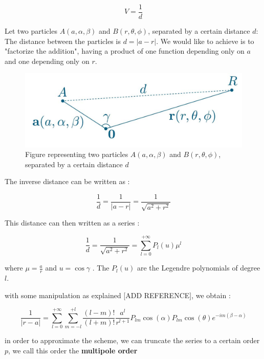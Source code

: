 \documentclass[12pt,twoside,a4paper]{report}
\begin{document}
	\begin{equation*}
	V = \frac{1}{d}
	\end{equation*}
	
	Let two particles $A(a,\alpha,\beta)$ and $B(r,\theta,\phi)$, separated by a certain distance $d$: The distance between the particles is $d = |a - r|$.
	We would like to achieve is to "factorize the addition", having a product of one function depending only on $a$ and one depending only on $r$.
	
	
\begin{figure}[H]
\includegraphics[scale=0.4]{distance}
 \centering 
\caption{Figure representing two particles $A(a,\alpha,\beta)$ and $B(r,\theta,\phi)$, separated by a certain distance $d$}
\label{fig:poster}
\end{figure}	
	
	
	The inverse distance can be written as :
	
	\begin{equation*}
		\frac{1}{d} = \frac{1}{|a-r|} = \frac{1}{\sqrt{a^2 + r^2}}
	\end{equation*}

	This distance can then written as a series :
	
	\begin{equation}
		\frac{1}{d} = \frac{1}{\sqrt{a^2 + r^2}} = \sum\limits_{l=0}^{+\infty} P_l(u)\mu^l
	\end{equation}
	
	
	where $\mu = \frac{a}{r}$ and $u = \cos{\gamma}$ . The $P_l(u)$ are the Legendre polynomials of degree $l$.
	
	with some manipulation as explained [ADD REFERENCE], we obtain : 
	
	\begin{equation}
	\frac{1}{|r - a|} = \sum\limits_{l=0}^{+\infty} \sum\limits_{m = -l}^{+l} \frac{(l-m)!}{(l+m)!} \frac{a^l}{r^{l+1}} P_{lm}\cos{(\alpha)}P_{lm}\cos{(\theta)}e^{-im(\beta - \alpha)}
	\end{equation}
	
	in order to approximate the scheme, we can truncate the series to a certain order $p$, we call this order the \textbf{multipole order}
	
\end{document}
